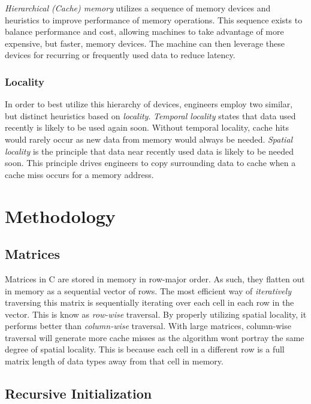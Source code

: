 \documentclass[conference]{IEEEtran}
\begin{document}
\emph{Hierarchical (Cache) memory} utilizes a sequence of memory devices
and heuristics to improve performance of memory operations. This
sequence exists to balance performance and cost, allowing machines to
take advantage of more expensive, but faster, memory devices. The
machine can then leverage these devices for recurring or frequently used
data to reduce latency.

\subsubsection{Locality}\label{locality}

In order to best utilize this hierarchy of devices, engineers employ two
similar, but distinct heuristics based on \emph{locality}.
\emph{Temporal locality} states that data used recently is likely to be
used again soon. Without temporal locality, cache hits would rarely
occur as new data from memory would always be needed. \emph{Spatial
locality} is the principle that data near recently used data is likely
to be needed soon. This principle drives engineers to copy surrounding
data to cache when a cache miss occurs for a memory address.

\section{Methodology}\label{methodology}

\subsection{Matrices}\label{matrices}

Matrices in C are stored in memory in row-major order. As such, they
flatten out in memory as a sequential vector of rows. The most efficient
way of \emph{iteratively} traversing this matrix is sequentially
iterating over each cell in each row in the vector. This is know as
\emph{row-wise} traversal. By properly utilizing spatial locality, it
performs better than \emph{column-wise} traversal. With large matrices,
column-wise traversal will generate more cache misses as the algorithm
wont portray the same degree of spatial locality. This is because each
cell in a different row is a full matrix length of data types away from
that cell in memory.

\subsection{Recursive Initialization}\label{recursive-initialization}
\end{document}
